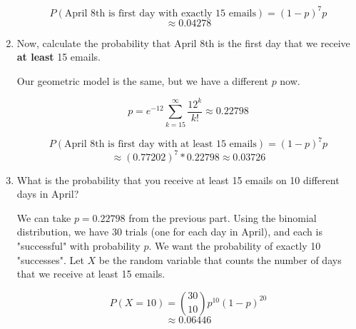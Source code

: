 \begin{enumerate}[label=(\alph*)]
\begin{solution}[2cm]
$$P(\text{April 8th is first day with exactly 15 emails}) = (1-p)^7 p$$
$$ \approx 0.04278$$
\end{solution}

\item Now, calculate the probability that April 8th is the first day that we receive \textbf{at least} 15 emails.
\begin{solution}[2cm]
Our geometric model is the same, but we have a different $p$ now.

$$p = e^{-12} \sum_{k = 15}^\infty \frac{12^k}{k!} \approx 0.22798$$

$$P(\text{April 8th is first day with at least 15 emails}) = (1-p)^7 p$$
$$\approx (0.77202)^7 * 0.22798 \approx 0.03726$$
\end{solution}

\item What is the probability that you receive at least 15 emails on 10 different days in April?
\begin{solution}[2cm]
We can take $p = 0.22798$ from the previous part. Using the binomial distribution, we have 30 trials (one for each day in April), and each is "successful" with probability $p$. We want the probability of exactly 10 "successes". Let $X$ be the random variable that counts the number of days that we receive at least 15 emails.

$$P(X = 10) = {30 \choose 10} p^{10} (1-p)^{20}$$
$$\approx 0.06446$$
\end{solution}

\end{enumerate}

\begin{comment}
\item What is the probability that you receive at least 15 emails on at least 15 days in April?
\begin{solution}[2cm]
$$P(X \geq 15) = P(X = 15) + P(X = 16) + ... + P(X = 30)$$
$$= \sum_{k = 15}^{30} {30 \choose k} 0.22798^k 0.77202^{30-k} \approx 0.00102$$
\end{solution}
\end{comment}